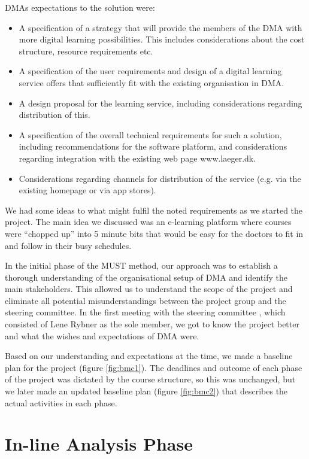DMAs expectations to the solution were:

\begin{itemize}
\item A specification of a strategy that will provide the members of the DMA with more digital learning possibilities. This includes considerations about the cost structure, resource requirements etc.
\item A specification of the user requirements and design of a digital learning service offers that sufficiently fit with the existing organisation in DMA.
\item A design proposal for the learning service, including considerations regarding distribution of this.
\item A specification of the overall technical requirements for such a solution, including recommendations for the software platform, and considerations regarding integration with the existing web page www.laeger.dk.
\item Considerations regarding channels for distribution of the service (e.g. via the existing homepage or via app stores).
\end{itemize}

We had some ideas to what might fulfil the noted requirements as we started the project. The main idea we discussed was an e-learning platform where courses were “chopped up” into 5 minute bits that would be easy for the doctors to fit in and follow in their busy schedules.

In the initial phase of the MUST method, our approach was to establish a thorough understanding of the organisational setup of DMA and identify the main stakeholders. This allowed us to understand the scope of the project and eliminate all potential misunderstandings between the project group and the steering committee. In the first meeting with the steering committee , which consisted of Lene Rybner as the sole member, we got to know the project better and what the wishes and expectations of DMA were.

Based on our understanding and expectations at the time, we made a baseline plan for the project (figure \ref{fig:bmc1}). The deadlines and outcome of each phase of the project was dictated by the course structure, so this was unchanged, but we later made an updated baseline plan (figure \ref{fig:bmc2}) that describes the actual activities in each phase.


\section{In-line Analysis Phase}
